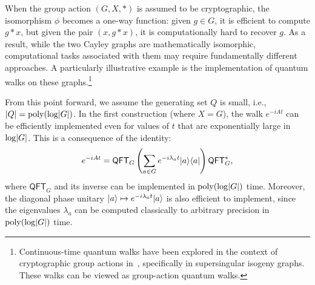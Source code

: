 \documentclass[11pt]{article}
\theoremstyle{definition}
\newcommand{\qft}{\mathsf{QFT}}
\begin{document}


    When the group action \( (G, X, *) \) is assumed to be cryptographic, the isomorphism \( \phi \) becomes a one-way function: given \( g \in G \), it is efficient to compute \( g * x \), but given the pair \( (x, g * x) \), it is computationally hard to recover \( g \). As a result, while the two Cayley graphs are mathematically isomorphic, computational tasks associated with them may require fundamentally different approaches. A particularly illustrative example is the implementation of quantum walks on these graphs.\footnote{Continuous-time quantum walks have been explored in the context of cryptographic group actions in~\cite{booher2024failing, doliskani2023sample}, specifically in supersingular isogeny graphs. These walks can be viewed as group-action quantum walks.}

    From this point forward, we assume the generating set \( Q \) is small, i.e., \( \lvert Q\rvert = \operatorname{poly}(\log \lvert G\rvert) \). In the first construction (where \( X = G \)), the walk \( e^{-iAt} \) can be efficiently implemented even for values of \( t \) that are exponentially large in \( \log \lvert G\rvert \). This is a consequence of the identity:
    \begin{equation}
        \label{eq:adjmat-fb}
        e^{-iAt} = \qft_G \left( \sum_{a \in G} e^{-i\lambda_a t} \ket{a} \bra{a} \right) \qft_G^*,
    \end{equation}
    where \( \qft_G \) and its inverse can be implemented in \( \operatorname{poly}(\log \lvert G\rvert) \) time. Moreover, the diagonal phase unitary \( \lvert a\rangle \mapsto e^{-i\lambda_a t} \lvert a\rangle \) is also efficient to implement, since the eigenvalues \( \lambda_a \) can be computed classically to arbitrary precision in \( \operatorname{poly}(\log \lvert G\rvert) \) time.
\end{document}

